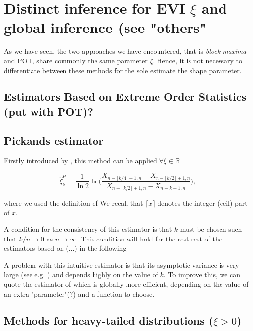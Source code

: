 \documentclass[11pt,a4paper,openany ]{book}
\begin{document}
\section*{Distinct inference for EVI $\xi$ and global inference (see "others"}
\citet[pp.140]{beirlant_statistics_2006}


As we have seen, the two approaches we have encountered, that is \emph{block-maxima} and POT, share commonly the same parameter $\xi$. Hence, it is not necessary to differentiate between these methods for the sole estimate the shape parameter. 

\subsection{Estimators Based on Extreme Order Statistics (put with POT)?}

\subsection*{Pickands estimator}


Firstly introduced by \cite{pickands_statistical_1975}, this method can be applied $\forall\xi\in\mathbb{R}$

\begin{equation}
\hat{\xi}^P_{k}= \frac{1}{\ln 2}\ln \Bigg(\frac{X_{n-\lceil k/4\rceil +1,n}-X_{n-\lceil k/2\rceil+1,n}}{X_{n-\lceil k/2\rceil +1,n}-X_{n-k+1,n}}\Bigg),
\end{equation}

where we used the definition of \citet{beirlant_statistics_2006}
We recall that $\lceil x\rceil$ denotes the integer (ceil) part of $x$.

A condition for the consistency of this estimator is that $k$ must be chosen such that $k/n\rightarrow 0$ as $n\rightarrow \infty$. This condition will hold for the rest rest of the estimators based on (...) in the following 

A problem with this intuitive estimator is that its asymptotic variance is very large (see e.g. \cite{dekkers_estimation_1989}) and depends highly on the value of $k$. To improve this, we can quote the estimator of \cite{segers_generalized_2001} which is globally more efficient, depending on the value of an extra-"parameter"(?) and a function to choose.


\subsection*{Methods for heavy-tailed distributions ($\xi>0$)}
\end{document}
